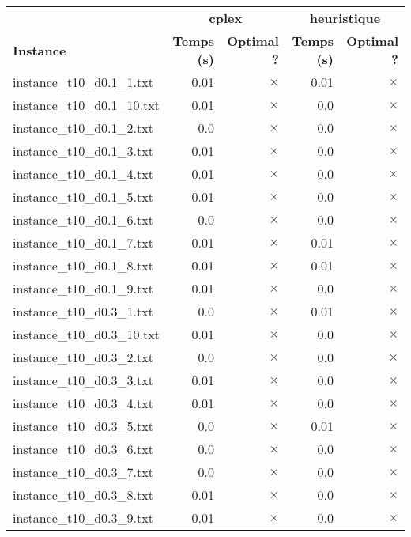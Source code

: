 \documentclass{article}
\begin{document}
\begin{center}
\renewcommand{\arraystretch}{1.4} 
 \begin{tabular}{lrrrr}
	\hline
 & \multicolumn{2}{c}{\textbf{cplex}} & \multicolumn{2}{c}{\textbf{heuristique}}\\
\textbf{Instance}  & \textbf{Temps (s)} & \textbf{Optimal ?}  & \textbf{Temps (s)} & \textbf{Optimal ?} \\\hline

instance\_t10\_d0.1\_1.txt & 0.01 & 
$\times$
 & 0.01 & 
$\times$
\\
instance\_t10\_d0.1\_10.txt & 0.01 & 
$\times$
 & 0.0 & 
$\times$
\\
instance\_t10\_d0.1\_2.txt & 0.0 & 
$\times$
 & 0.0 & 
$\times$
\\
instance\_t10\_d0.1\_3.txt & 0.01 & 
$\times$
 & 0.0 & 
$\times$
\\
instance\_t10\_d0.1\_4.txt & 0.01 & 
$\times$
 & 0.0 & 
$\times$
\\
instance\_t10\_d0.1\_5.txt & 0.01 & 
$\times$
 & 0.0 & 
$\times$
\\
instance\_t10\_d0.1\_6.txt & 0.0 & 
$\times$
 & 0.0 & 
$\times$
\\
instance\_t10\_d0.1\_7.txt & 0.01 & 
$\times$
 & 0.01 & 
$\times$
\\
instance\_t10\_d0.1\_8.txt & 0.01 & 
$\times$
 & 0.01 & 
$\times$
\\
instance\_t10\_d0.1\_9.txt & 0.01 & 
$\times$
 & 0.0 & 
$\times$
\\
instance\_t10\_d0.3\_1.txt & 0.0 & 
$\times$
 & 0.01 & 
$\times$
\\
instance\_t10\_d0.3\_10.txt & 0.01 & 
$\times$
 & 0.0 & 
$\times$
\\
instance\_t10\_d0.3\_2.txt & 0.0 & 
$\times$
 & 0.0 & 
$\times$
\\
instance\_t10\_d0.3\_3.txt & 0.01 & 
$\times$
 & 0.0 & 
$\times$
\\
instance\_t10\_d0.3\_4.txt & 0.01 & 
$\times$
 & 0.0 & 
$\times$
\\
instance\_t10\_d0.3\_5.txt & 0.0 & 
$\times$
 & 0.01 & 
$\times$
\\
instance\_t10\_d0.3\_6.txt & 0.0 & 
$\times$
 & 0.0 & 
$\times$
\\
instance\_t10\_d0.3\_7.txt & 0.0 & 
$\times$
 & 0.0 & 
$\times$
\\
instance\_t10\_d0.3\_8.txt & 0.01 & 
$\times$
 & 0.0 & 
$\times$
\\
instance\_t10\_d0.3\_9.txt & 0.01 & 
$\times$
 & 0.0 & 
$\times$
\\

\end{tabular}
\end{center}
\end{document}
